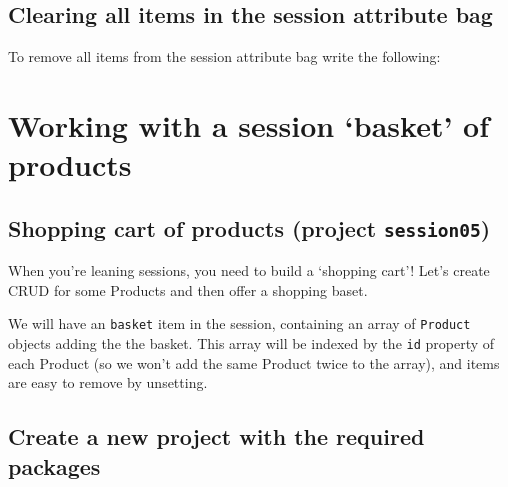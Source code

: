 \documentclass[a4paperpaper,openright]{book}
\newenvironment{Shaded}{}{}
\newcommand{\KeywordTok}[1]{\textcolor[rgb]{0.00,0.44,0.13}{\textbf{#1}}}
\newcommand{\NormalTok}[1]{#1}
\newcommand{\OtherTok}[1]{\textcolor[rgb]{0.00,0.44,0.13}{#1}}
\newcommand{\StringTok}[1]{\textcolor[rgb]{0.25,0.44,0.63}{#1}}
\begin{document}
\begin{Shaded}
\end{Shaded}

\hypertarget{clearing-all-items-in-the-session-attribute-bag}{%
\section{Clearing all items in the session attribute
bag}\label{clearing-all-items-in-the-session-attribute-bag}}

To remove all items from the session attribute bag write the following:

\begin{Shaded}
\end{Shaded}

\hypertarget{working-with-a-session-basket-of-products}{%
\chapter{Working with a session `basket' of
products}\label{working-with-a-session-basket-of-products}}

\hypertarget{shopping-cart-of-products-project-session05}{%
\section{\texorpdfstring{Shopping cart of products (project
\texttt{session05})}{Shopping cart of products (project session05)}}\label{shopping-cart-of-products-project-session05}}

When you're leaning sessions, you need to build a `shopping cart'! Let's
create CRUD for some Products and then offer a shopping baset.

We will have an \texttt{basket} item in the session, containing an array
of \texttt{Product} objects adding the the basket. This array will be
indexed by the \texttt{id} property of each Product (so we won't add the
same Product twice to the array), and items are easy to remove by
unsetting.

\hypertarget{create-a-new-project-with-the-required-packages}{%
\section{Create a new project with the required
packages}\label{create-a-new-project-with-the-required-packages}}
\end{document}
